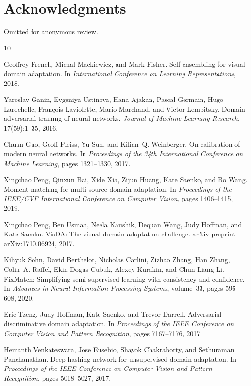 \section*{Acknowledgments}

Omitted for anonymous review.

\begin{thebibliography}{10}

Geoffrey French, Michal Mackiewicz, and Mark Fisher.
\newblock Self-ensembling for visual domain adaptation.
\newblock In \emph{International Conference on Learning Representations}, 2018.

Yaroslav Ganin, Evgeniya Ustinova, Hana Ajakan, Pascal Germain, Hugo Larochelle,
Fran\c{c}ois Laviolette, Mario Marchand, and Victor Lempitsky.
\newblock Domain-adversarial training of neural networks.
\newblock \emph{Journal of Machine Learning Research}, 17(59):1--35, 2016.

Chuan Guo, Geoff Pleiss, Yu Sun, and Kilian~Q. Weinberger.
\newblock On calibration of modern neural networks.
\newblock In \emph{Proceedings of the 34th International Conference on Machine
Learning}, pages 1321--1330, 2017.

Xingchao Peng, Qinxun Bai, Xide Xia, Zijun Huang, Kate Saenko, and Bo Wang.
\newblock Moment matching for multi-source domain adaptation.
\newblock In \emph{Proceedings of the IEEE/CVF International Conference on
Computer Vision}, pages 1406--1415, 2019.

Xingchao Peng, Ben Usman, Neela Kaushik, Dequan Wang, Judy Hoffman, and
Kate Saenko.
\newblock VisDA: The visual domain adaptation challenge.
\newblock arXiv preprint arXiv:1710.06924, 2017.

Kihyuk Sohn, David Berthelot, Nicholas Carlini, Zizhao Zhang, Han Zhang,
Colin~A. Raffel, Ekin Dogus Cubuk, Alexey Kurakin, and Chun-Liang Li.
\newblock FixMatch: Simplifying semi-supervised learning with consistency and
confidence.
\newblock In \emph{Advances in Neural Information Processing Systems},
volume~33, pages 596--608, 2020.

Eric Tzeng, Judy Hoffman, Kate Saenko, and Trevor Darrell.
\newblock Adversarial discriminative domain adaptation.
\newblock In \emph{Proceedings of the IEEE Conference on Computer Vision and
Pattern Recognition}, pages 7167--7176, 2017.

Hemanth Venkateswara, Jose Eusebio, Shayok Chakraborty, and Sethuraman
Panchanathan.
\newblock Deep hashing network for unsupervised domain adaptation.
\newblock In \emph{Proceedings of the IEEE Conference on Computer Vision and
Pattern Recognition}, pages 5018--5027, 2017.

\end{thebibliography}
